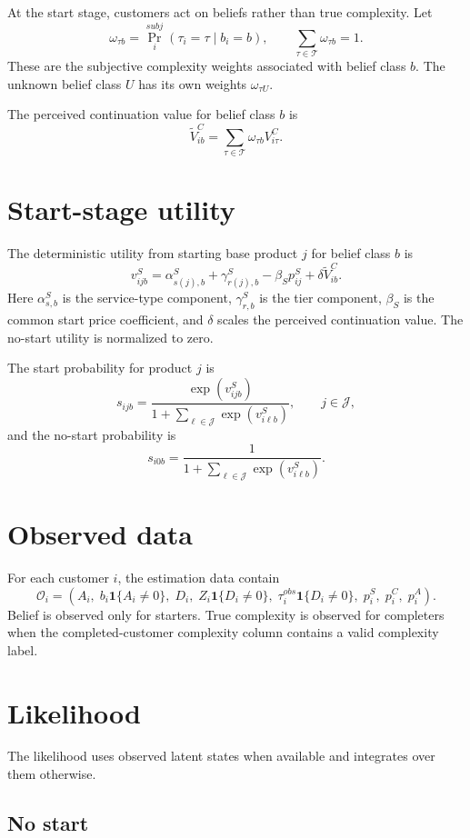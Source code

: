 \documentclass[11pt]{article}
\newcommand{\J}{\mathcal{J}}
\newcommand{\Tset}{\mathcal{T}}
\newcommand{\Prb}{\Pr}
\newcommand{\one}{\mathbf{1}}
\begin{document}
At the start stage, customers act on beliefs rather than true complexity. Let
\[
\omega_{\tau b}=\Prb_i^{subj}(\tau_i=\tau\mid b_i=b),
\qquad
\sum_{\tau\in\Tset}\omega_{\tau b}=1.
\]
These are the subjective complexity weights associated with belief class $b$. The unknown belief class $U$ has its own weights $\omega_{\tau U}$.

The perceived continuation value for belief class $b$ is
\[
\widetilde V^C_{ib}
=
\sum_{\tau\in\Tset}\omega_{\tau b}V^C_{i\tau}.
\]

\section{Start-stage utility}

The deterministic utility from starting base product $j$ for belief class $b$ is
\[
v^S_{ijb}
=
\alpha^S_{s(j),b}
+
\gamma^S_{r(j),b}
-
\beta_S p_{ij}^S
+
\delta\widetilde V^C_{ib}.
\]
Here $\alpha^S_{s,b}$ is the service-type component, $\gamma^S_{r,b}$ is the tier component, $\beta_S$ is the common start price coefficient, and $\delta$ scales the perceived continuation value. The no-start utility is normalized to zero.

The start probability for product $j$ is
\[
s_{ijb}
=
\frac{\exp(v^S_{ijb})}
{1+\sum_{\ell\in\J}\exp(v^S_{i\ell b})},
\qquad j\in\J,
\]
and the no-start probability is
\[
s_{i0b}
=
\frac{1}{1+\sum_{\ell\in\J}\exp(v^S_{i\ell b})}.
\]

\section{Observed data}

For each customer $i$, the estimation data contain
\[
\mathcal{O}_i=\left(A_i,\; b_i\one\{A_i\neq0\},\; D_i,\; Z_i\one\{D_i\neq0\},\; \tau_i^{obs}\one\{D_i\neq0\},\; p_i^S,\; p_i^C,\; p_i^A\right).
\]
Belief is observed only for starters. True complexity is observed for completers when the completed-customer complexity column contains a valid complexity label.

\section{Likelihood}

The likelihood uses observed latent states when available and integrates over them otherwise.

\subsection*{No start}
\end{document}

